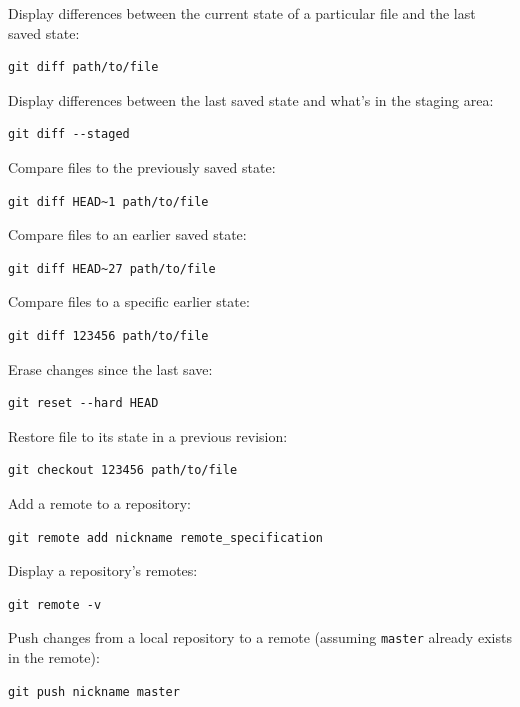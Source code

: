 \documentclass{book}
\begin{document}
Display differences between the current state of a particular file and
the last saved state:

\begin{verbatim}
git diff path/to/file
\end{verbatim}

Display differences between the last saved state and what's in the
staging area:

\begin{verbatim}
git diff --staged
\end{verbatim}

Compare files to the previously saved state:

\begin{verbatim}
git diff HEAD~1 path/to/file
\end{verbatim}

Compare files to an earlier saved state:

\begin{verbatim}
git diff HEAD~27 path/to/file
\end{verbatim}

Compare files to a specific earlier state:

\begin{verbatim}
git diff 123456 path/to/file
\end{verbatim}

Erase changes since the last save:

\begin{verbatim}
git reset --hard HEAD
\end{verbatim}

Restore file to its state in a previous revision:

\begin{verbatim}
git checkout 123456 path/to/file
\end{verbatim}

Add a remote to a repository:

\begin{verbatim}
git remote add nickname remote_specification
\end{verbatim}

Display a repository's remotes:

\begin{verbatim}
git remote -v
\end{verbatim}

Push changes from a local repository to a remote (assuming
\texttt{master} already exists in the remote):

\begin{verbatim}
git push nickname master
\end{verbatim}
\end{document}
